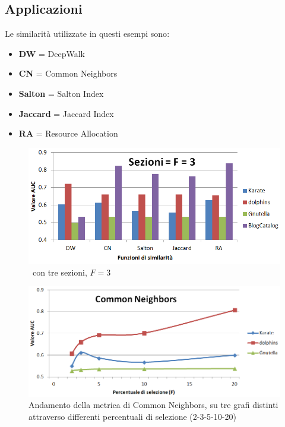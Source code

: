 \subsection{Applicazioni}
Le similarità utilizzate in questi esempi sono\cite{all_metric}:
\begin{itemize}
	\item \textbf{DW} = DeepWalk
	\item \textbf{CN} = Common Neighbors\cite{CN_metric}
	\item \textbf{Salton} = Salton Index\cite{Salton_metric}
	\item \textbf{Jaccard} = Jaccard Index
	\item \textbf{RA} = Resource Allocation\cite{RA_metric}
\end{itemize}
%
\begin{figure}[htp]
	\centering
	\includegraphics[width=\linewidth]{immagini/LP_fold3}
	\caption{\LPred\ con tre sezioni, $F=3$}
	\label{fig:LP_fold3}
\end{figure}
%
\begin{figure}[htp]
	\centering
	\includegraphics[width=\linewidth]{immagini/LP_CN}
	\caption{Andamento della metrica di Common Neighbors, su tre grafi distinti attraverso differenti percentuali di selezione (2-3-5-10-20)}
	\label{fig:LP_CN}
\end{figure}
%
